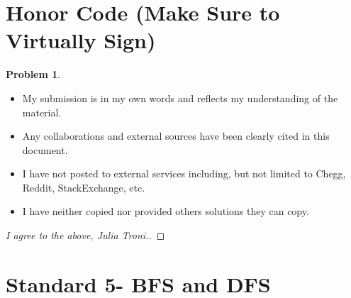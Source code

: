 \documentclass[11pt]{article}
\theoremstyle{definition}
\theoremstyle{definition}
\newtheorem{required}{Problem}
\theoremstyle{definition}
\begin{document}
\section{Honor Code (Make Sure to Virtually Sign)} \label{HonorCode}

\begin{required}
\begin{itemize}
\item My submission is in my own words and reflects my understanding of the material.
\item Any collaborations and external sources have been clearly cited in this document.
\item I have not posted to external services including, but not limited to Chegg, Reddit, StackExchange, etc.
\item I have neither copied nor provided others solutions they can copy.
\end{itemize}

\end{required}

\begin{proof}[I agree to the above, Julia Troni.]
\end{proof}


\newpage
\section{Standard 5- BFS and DFS}
\end{document}
